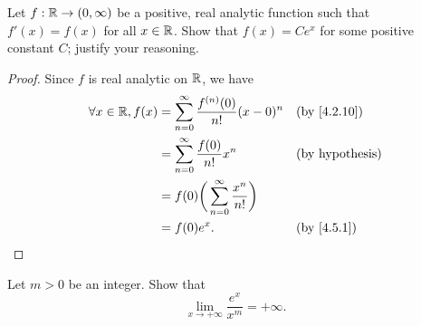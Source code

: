 \begin{ex}\label{ex:4.5.7}
  Let \(f : \mathbb{R} \to (0, \infty)\) be a positive, real analytic function such that \(f'(x) = f(x)\) for all \(x \in \mathbb{R}\).
  Show that \(f(x) = C e^x\) for some positive constant \(C\);
  justify your reasoning.
\end{ex}

\begin{proof}
  Since \(f\) is real analytic on \(\mathbb{R}\), we have
  \begin{align*}
    \forall x \in \R, f(x) & = \sum_{n = 0}^\infty \dfrac{f^{(n)}(0)}{n!} (x - 0)^n &  & \by{4.2.10}            \\
                           & = \sum_{n = 0}^\infty \dfrac{f(0)}{n!} x^n             &  & \text{(by hypothesis)} \\
                           & = f(0) \bigg(\sum_{n = 0}^\infty \dfrac{x^n}{n!}\bigg)                             \\
                           & = f(0) e^x.                                            &  & \by{4.5.1}
  \end{align*}
\end{proof}

\begin{ex}\label{ex:4.5.8}
  Let \(m > 0\) be an integer.
  Show that
  \[
    \lim_{x \to +\infty} \dfrac{e^x}{x^m} = +\infty.
  \]
\end{ex}

